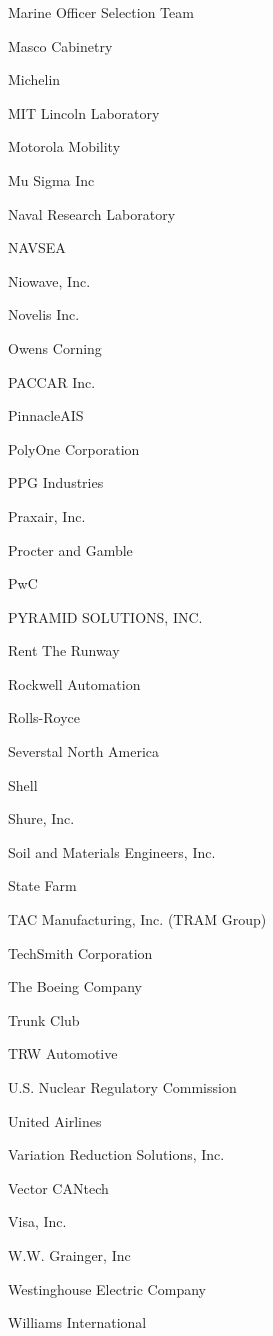 \documentclass[twoside]{article}
\begin{document}
\begin{center}
\begin{multicols}{5}
\begin{FlushLeft}
\begin{compactitem}
\item Marine Officer Selection Team
\item Masco Cabinetry
\item Michelin
\item MIT Lincoln Laboratory
\item Motorola Mobility
\item Mu Sigma Inc
\item Naval Research Laboratory
\item NAVSEA
\item Niowave, Inc.
\item Novelis Inc.
\item Owens Corning
\item PACCAR Inc.
\item PinnacleAIS
\item PolyOne Corporation
\item PPG Industries
\item Praxair, Inc.
\item Procter and Gamble
\item PwC
\item PYRAMID SOLUTIONS, INC.
\item Rent The Runway
\item Rockwell Automation
\item Rolls-Royce
\item Severstal North America
\item Shell
\item Shure, Inc.
\item Soil and Materials Engineers, Inc.
\item State Farm
\item TAC Manufacturing, Inc. (TRAM Group)
\item TechSmith Corporation
\item The Boeing Company
\item Trunk Club
\item TRW Automotive
\item U.S. Nuclear Regulatory Commission
\item United Airlines
\item Variation Reduction Solutions, Inc.
\item Vector CANtech
\item Visa, Inc.
\item W.W. Grainger, Inc
\item Westinghouse Electric Company
\item Williams International
\end{compactitem}

\end{FlushLeft}
\end{multicols}
\end{center}
\end{document}
